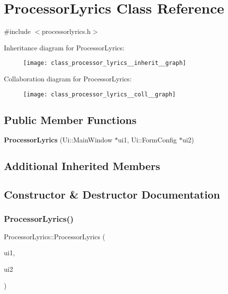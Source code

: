 \section{Processor\+Lyrics Class Reference}
\label{class_processor_lyrics}


{\ttfamily \#include $<$processorlyrics.\+h$>$}



Inheritance diagram for Processor\+Lyrics\+:\nopagebreak
\begin{figure}[H]
\begin{center}
\leavevmode
\texttt{[image: class\_processor\_lyrics\_\_inherit\_\_graph]}
\end{center}
\end{figure}


Collaboration diagram for Processor\+Lyrics\+:\nopagebreak
\begin{figure}[H]
\begin{center}
\leavevmode
\texttt{[image: class\_processor\_lyrics\_\_coll\_\_graph]}
\end{center}
\end{figure}
\subsection*{Public Member Functions}
\begin{DoxyCompactItemize}
\item 
\textbf{ Processor\+Lyrics} (Ui\+::\+Main\+Window $\ast$ui1, Ui\+::\+Form\+Config $\ast$ui2)
\end{DoxyCompactItemize}
\subsection*{Additional Inherited Members}


\subsection{Constructor \& Destructor Documentation}
\mbox{\label{class_processor_lyrics_a1f20f635b481a8e8c8f3848142bc36fa}} 
\subsubsection{Processor\+Lyrics()}
{\footnotesize\ttfamily Processor\+Lyrics\+::\+Processor\+Lyrics (\begin{DoxyParamCaption}\item[{Ui\+::\+Main\+Window $\ast$}]{ui1,  }\item[{Ui\+::\+Form\+Config $\ast$}]{ui2 }\end{DoxyParamCaption})}


